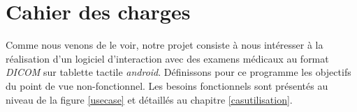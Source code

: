 \chapter{Cahier des charges}
\minitoc

Comme nous venons de le voir, notre projet consiste à nous intéresser à la réalisation d'un logiciel d'interaction avec des examens médicaux au format \emph{DICOM} sur tablette tactile \emph{android}. Définissons pour ce programme les objectifs du point de vue non-fonctionnel. Les besoins fonctionnels sont présentés au niveau de la figure \vref{usecase} et détaillés au chapitre \vref{casutilisation}.


